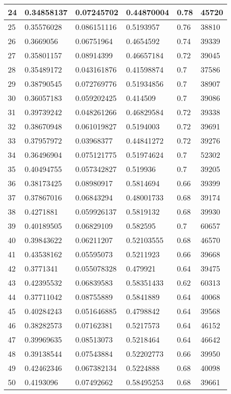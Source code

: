 \begin{longtable}{|l|l|l|l|l|l|}
24 & 0.34858137 & 0.07245702 & 0.44870004 & 0.78 & 45720 \\ \hline 
25 & 0.35576028 & 0.086151116 & 0.5193957 & 0.76 & 38810 \\ \hline 
26 & 0.3669056 & 0.06751964 & 0.4654592 & 0.74 & 39339 \\ \hline 
27 & 0.35801157 & 0.08914399 & 0.46657184 & 0.72 & 39045 \\ \hline 
28 & 0.35489172 & 0.043161876 & 0.41598874 & 0.7 & 37586 \\ \hline 
29 & 0.38790545 & 0.072769776 & 0.51934856 & 0.7 & 38907 \\ \hline 
30 & 0.36057183 & 0.059202425 & 0.414509 & 0.7 & 39086 \\ \hline 
31 & 0.39739242 & 0.048261266 & 0.46829584 & 0.72 & 39338 \\ \hline 
32 & 0.38670948 & 0.061019827 & 0.5194003 & 0.72 & 39691 \\ \hline 
33 & 0.37957972 & 0.03968377 & 0.44841272 & 0.72 & 39276 \\ \hline 
34 & 0.36496904 & 0.075121775 & 0.51974624 & 0.7 & 52302 \\ \hline 
35 & 0.40494755 & 0.057342827 & 0.519936 & 0.7 & 39205 \\ \hline 
36 & 0.38173425 & 0.08980917 & 0.5814694 & 0.66 & 39399 \\ \hline 
37 & 0.37867016 & 0.06843294 & 0.48001733 & 0.68 & 39174 \\ \hline 
38 & 0.4271881 & 0.059926137 & 0.5819132 & 0.68 & 39930 \\ \hline 
39 & 0.40189505 & 0.06829109 & 0.582595 & 0.7 & 60657 \\ \hline 
40 & 0.39843622 & 0.06211207 & 0.52103555 & 0.68 & 46570 \\ \hline 
41 & 0.43538162 & 0.05595073 & 0.5211923 & 0.66 & 39668 \\ \hline 
42 & 0.3771341 & 0.055078328 & 0.479921 & 0.64 & 39475 \\ \hline 
43 & 0.42395532 & 0.06839583 & 0.58351433 & 0.62 & 60313 \\ \hline 
44 & 0.37711042 & 0.08755889 & 0.5841889 & 0.64 & 40068 \\ \hline 
45 & 0.40284243 & 0.051646885 & 0.4798842 & 0.64 & 39568 \\ \hline 
46 & 0.38282573 & 0.07162381 & 0.5217573 & 0.64 & 46152 \\ \hline 
47 & 0.39969635 & 0.08513073 & 0.5218464 & 0.64 & 46642 \\ \hline 
48 & 0.39138544 & 0.07543884 & 0.52202773 & 0.66 & 39950 \\ \hline 
49 & 0.42462346 & 0.067382134 & 0.5224888 & 0.68 & 40098 \\ \hline 
50 & 0.4193096 & 0.07492662 & 0.58495253 & 0.68 & 39661 \\ \hline 
\end{longtable}